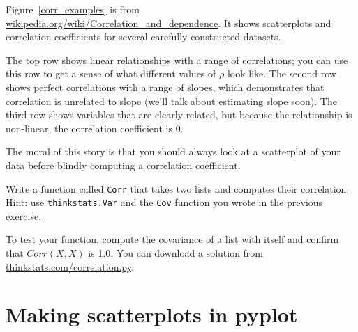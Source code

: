 \documentclass[12pt]{book}
\begin{document}
Figure~\ref{corr_examples} is from
\url{wikipedia.org/wiki/Correlation_and_dependence}.  It shows
scatterplots and correlation coefficients for several
carefully-constructed datasets.



The top row shows linear relationships with a range of correlations;
you can use this row to get a sense of what different values of $\rho$
look like.  The second row shows perfect correlations with a range of
slopes, which demonstrates that correlation is unrelated to slope
(we'll talk about estimating slope soon).  The third
row shows variables that are clearly related, but because the
relationship is non-linear, the correlation coefficient is 0.

The moral of this story is that you should always look at a scatterplot of
your data before blindly computing a correlation coefficient.


\begin{exercise}
Write a function called {\tt Corr} that takes two lists and
computes their correlation.  Hint: use {\tt thinkstats.Var} and
the {\tt Cov} function you wrote in the previous exercise.


To test your function, compute the covariance of a list with itself
and confirm that $Corr(X, X)$ is 1.0.  You can download a solution
from \url{thinkstats.com/correlation.py}.


\end{exercise}


\section{Making scatterplots in pyplot}

\end{document}
